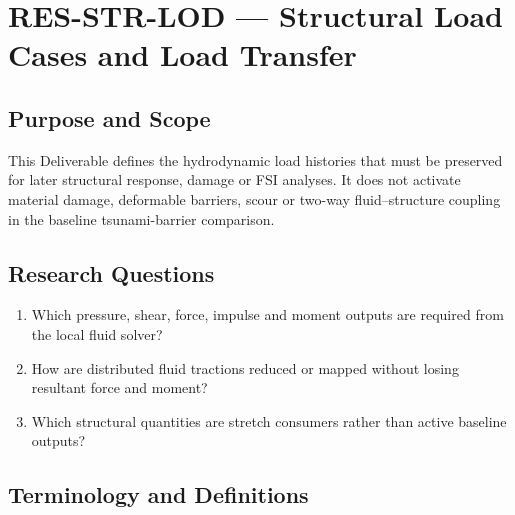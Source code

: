 
\section{RES-STR-LOD --- Structural Load Cases and Load Transfer}
\label{sec:res-str-lod}

\subsection{Purpose and Scope}
\label{sec:res-str-lod-purpose}

This Deliverable defines the hydrodynamic load histories that must be
preserved for later structural response, damage or FSI analyses. It
does not activate material damage, deformable barriers, scour or
two-way fluid--structure coupling in the baseline tsunami-barrier
comparison.

\subsection{Research Questions}
\label{sec:res-str-lod-research-questions}

\begin{enumerate}
  \item Which pressure, shear, force, impulse and moment outputs are
    required from the local fluid solver?
  \item How are distributed fluid tractions reduced or mapped without
    losing resultant force and moment?
  \item Which structural quantities are stretch consumers rather than
    active baseline outputs?
\end{enumerate}

\subsection{Terminology and Definitions}
\label{sec:res-str-lod-definitions}


